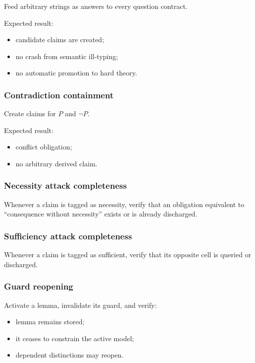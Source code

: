\documentclass[
]{article}
\providecommand{\tightlist}{%
  \setlength{\itemsep}{0pt}\setlength{\parskip}{0pt}}
\begin{document}
Feed arbitrary strings as answers to every question contract.

Expected result:

\begin{itemize}
\tightlist
\item
  candidate claims are created;
\item
  no crash from semantic ill-typing;
\item
  no automatic promotion to hard theory.
\end{itemize}

\subsubsection{Contradiction
containment}\label{contradiction-containment}

Create claims for \(P\) and \(\neg P\).

Expected result:

\begin{itemize}
\tightlist
\item
  conflict obligation;
\item
  no arbitrary derived claim.
\end{itemize}

\subsubsection{Necessity attack
completeness}\label{necessity-attack-completeness}

Whenever a claim is tagged as necessity, verify that an obligation
equivalent to ``consequence without necessity'' exists or is already
discharged.

\subsubsection{Sufficiency attack
completeness}\label{sufficiency-attack-completeness}

Whenever a claim is tagged as sufficient, verify that its opposite cell
is queried or discharged.

\subsubsection{Guard reopening}\label{guard-reopening}

Activate a lemma, invalidate its guard, and verify:

\begin{itemize}
\tightlist
\item
  lemma remains stored;
\item
  it ceases to constrain the active model;
\item
  dependent distinctions may reopen.
\end{itemize}
\end{document}
